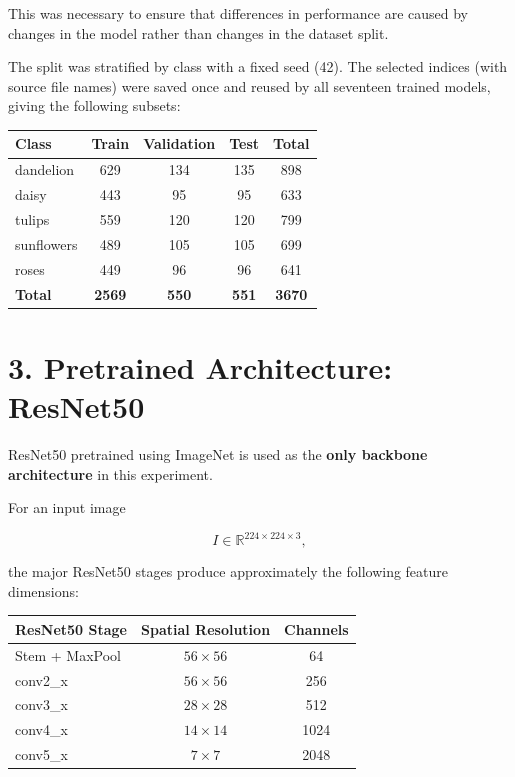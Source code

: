 \documentclass[10pt]{article}
\begin{document}
This was necessary to ensure that differences in performance are caused by
changes in the model rather than changes in the dataset split.

The split was stratified by class with a fixed seed (42). The selected indices
(with source file names) were saved once and reused by all seventeen trained
models, giving the following subsets:

\begin{center}
\begin{tabular}{|l|c|c|c|c|}
\hline
\textbf{Class} & \textbf{Train} & \textbf{Validation} & \textbf{Test} & \textbf{Total}\\
\hline
dandelion & 629 & 134 & 135 & 898\\
daisy & 443 & 95 & 95 & 633\\
tulips & 559 & 120 & 120 & 799\\
sunflowers & 489 & 105 & 105 & 699\\
roses & 449 & 96 & 96 & 641\\
\hline
\textbf{Total} & \textbf{2569} & \textbf{550} & \textbf{551} & \textbf{3670}\\
\hline
\end{tabular}
\end{center}

\section*{3. Pretrained Architecture: ResNet50}

ResNet50 pretrained using ImageNet is used as the
\textbf{only backbone architecture} in this experiment.

For an input image

\[
I\in\mathbb{R}^{224\times224\times3},
\]

the major ResNet50 stages produce approximately the following feature
dimensions:

\begin{center}

\begin{tabular}{|l|c|c|}
\hline
\textbf{ResNet50 Stage}
&
\textbf{Spatial Resolution}
&
\textbf{Channels}
\\
\hline

Stem + MaxPool
&
$56\times56$
&
64
\\
\hline

conv2\_x
&
$56\times56$
&
256
\\
\hline

conv3\_x
&
$28\times28$
&
512
\\
\hline

conv4\_x
&
$14\times14$
&
1024
\\
\hline

conv5\_x
&
$7\times7$
&
2048
\\
\hline

\end{tabular}

\end{center}
\end{document}
